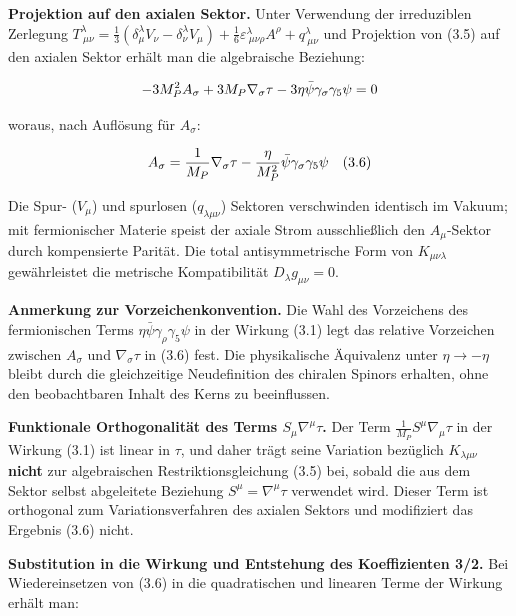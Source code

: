 ﻿\documentclass[11pt,letterpaper]{article}
\begin{document}
\textbf{Projektion auf den axialen Sektor.} Unter Verwendung der irreduziblen Zerlegung $T^\lambda_{\ \mu\nu} = \frac{1}{3}(\delta^\lambda_\mu V_\nu - \delta^\lambda_\nu V_\mu) + \frac{1}{6}\varepsilon^\lambda_{\ \mu\nu\rho}A^\rho + q^\lambda_{\ \mu\nu}$ und Projektion von (3.5) auf den axialen Sektor erhält man die algebraische Beziehung:

\begin{equation*}
  \resizebox{\ifdim\width>\linewidth \linewidth\else\width\fi}{!}{$\displaystyle -3M_P^2 A_\sigma + 3M_P\nabla_\sigma\tau - 3\eta\bar{\psi}\gamma_\sigma\gamma_5\psi = 0$}
\end{equation*}

woraus, nach Auflösung für $A_\sigma$:

\begin{equation*}
  \resizebox{\ifdim\width>\linewidth \linewidth\else\width\fi}{!}{$\displaystyle A_\sigma = \frac{1}{M_P}\nabla_\sigma\tau - \frac{\eta}{M_P^2}\bar{\psi}\gamma_\sigma\gamma_5\psi \quad (3.6)$}
\end{equation*}

Die Spur- ($V_\mu$) und spurlosen ($q_{\lambda\mu\nu}$) Sektoren verschwinden identisch im Vakuum; mit fermionischer Materie speist der axiale Strom ausschließlich den $A_\mu$-Sektor durch kompensierte Parität. Die total antisymmetrische Form von $K_{\mu\nu\lambda}$ gewährleistet die metrische Kompatibilität $D_\lambda g_{\mu\nu} = 0$.

\textbf{Anmerkung zur Vorzeichenkonvention.} Die Wahl des Vorzeichens des fermionischen Terms $\eta\bar{\psi}\gamma_\rho\gamma_5\psi$ in der Wirkung (3.1) legt das relative Vorzeichen zwischen $A_\sigma$ und $\nabla_\sigma\tau$ in (3.6) fest. Die physikalische Äquivalenz unter $\eta \to -\eta$ bleibt durch die gleichzeitige Neudefinition des chiralen Spinors erhalten, ohne den beobachtbaren Inhalt des Kerns zu beeinflussen.

\textbf{Funktionale Orthogonalität des Terms $S_\mu\nabla^\mu\tau$.} Der Term $\frac{1}{M_P}S^\mu\nabla_\mu\tau$ in der Wirkung (3.1) ist linear in $\tau$, und daher trägt seine Variation bezüglich $K_{\lambda\mu\nu}$ \textbf{nicht} zur algebraischen Restriktionsgleichung (3.5) bei, sobald die aus dem Sektor selbst abgeleitete Beziehung $S^\mu = \nabla^\mu\tau$ verwendet wird. Dieser Term ist orthogonal zum Variationsverfahren des axialen Sektors und modifiziert das Ergebnis (3.6) nicht.

\textbf{Substitution in die Wirkung und Entstehung des Koeffizienten 3/2.} Bei Wiedereinsetzen von (3.6) in die quadratischen und linearen Terme der Wirkung erhält man:
\end{document}
